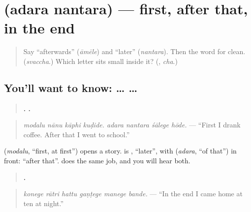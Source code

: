 \section[\texorpdfstring{\kn{ಅದರ} \kn{ನಂತರ} (adara nantara)}{ಅದರ ನಂತರ (adara nantara)}]{  (adara nantara) — first, after that, in the end}

\label{lesson:KA-C310-adara-nantara}



\begin{quote}
Say \textquotedblleft{}afterwards\textquotedblright{} (\emph{āmēle}) and \textquotedblleft{}later\textquotedblright{} (\emph{nantara}). Then the word for clean. (\emph{svaccha}.) Which letter sits small inside it? (\textbf{}, \emph{cha}.)
\end{quote}

\subsection*{You'll want to know:  …   … }
\begin{quote}
\textbf{   .    .}
\end{quote}

\begin{quote}
\emph{modalu nānu kāphi kuḍide. adara nantara śālege hōde.} — \textquotedblleft{}First I drank coffee. After that I went to school.\textquotedblright{}
\end{quote}

\textbf{} (\emph{modalu}, \textquotedblleft{}first, at first\textquotedblright{}) opens a story. \textbf{ } is \textbf{}, \textquotedblleft{}later\textquotedblright{}, with \textbf{} (\emph{adara}, \textquotedblleft{}of that\textquotedblright{}) in front: \textquotedblleft{}after that\textquotedblright{}. \textbf{} does the same job, and you will hear both.

\begin{quote}
\textbf{     .}
\end{quote}

\begin{quote}
\emph{konege rātri hattu gaṇṭege manege bande.} — \textquotedblleft{}In the end I came home at ten at night.\textquotedblright{}
\end{quote}

